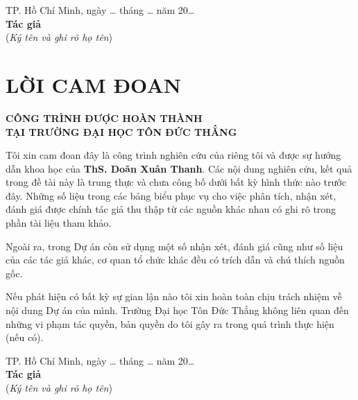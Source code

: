 \documentclass[12pt, a4paper]{report}
\newcommand{\supervisor}{ThS. Doãn Xuân Thanh}
\begin{document}
\vspace{3cm}
\begin{flushright}
  \begin{minipage}{10cm}
    \centering
    TP. Hồ Chí Minh, ngày \ldots{} tháng \ldots{} năm 20\ldots{}\\[1cm]
    \textbf{Tác giả}\\[0.3cm]
    (\textit{Ký tên và ghi rõ họ tên})
  \end{minipage}
\end{flushright}
\newpage

\chapter*{LỜI CAM ĐOAN}

\begin{center}
  \textbf{CÔNG TRÌNH ĐƯỢC HOÀN THÀNH\\
  TẠI TRƯỜNG ĐẠI HỌC TÔN ĐỨC THẮNG}
\end{center}

\noindent Tôi xin cam đoan đây là công trình nghiên cứu của riêng tôi và được sự hướng dẫn
khoa học của \textbf{\supervisor}. Các nội dung nghiên cứu, kết quả trong đề tài này là
trung thực và chưa công bố dưới bất kỳ hình thức nào trước đây. Những số liệu trong các
bảng biểu phục vụ cho việc phân tích, nhận xét, đánh giá được chính tác giả thu thập từ
các nguồn khác nhau có ghi rõ trong phần tài liệu tham khảo.

\noindent Ngoài ra, trong Dự án còn sử dụng một số nhận xét, đánh giá cũng như số liệu của
các tác giả khác, cơ quan tổ chức khác đều có trích dẫn và chú thích nguồn gốc.

\noindent Nếu phát hiện có bất kỳ sự gian lận nào tôi xin hoàn toàn chịu trách nhiệm về
nội dung Dự án của mình. Trường Đại học Tôn Đức Thắng không liên quan đến những vi phạm
tác quyền, bản quyền do tôi gây ra trong quá trình thực hiện (nếu có).

\vspace{3cm}
\begin{flushright}
  \begin{minipage}{10cm}
    \centering
    TP. Hồ Chí Minh, ngày \ldots{} tháng \ldots{} năm 20\ldots{}\\[1cm]
    \textbf{Tác giả}\\[0.3cm]
    (\textit{Ký tên và ghi rõ họ tên})
  \end{minipage}
\end{flushright}
\newpage
\end{document}
